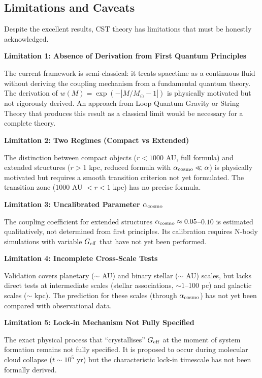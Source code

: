\documentclass[11pt,a4paper]{article}
\begin{document}
\hypertarget{limitations-and-caveats}{%
\subsection{Limitations and
Caveats}\label{limitations-and-caveats}}

Despite the excellent results, CST theory has limitations that must be
honestly acknowledged.

\textbf{Limitation 1: Absence of Derivation from First Quantum
Principles}

The current framework is semi-classical: it treats spacetime as a
continuous fluid without deriving the coupling mechanism from a
fundamental quantum theory. The derivation of
\(w(M) = \exp(-|M/M_\odot - 1|)\) is physically motivated but not
rigorously derived. An approach from Loop Quantum Gravity or String
Theory that produces this result as a classical limit would be necessary
for a complete theory.

\textbf{Limitation 2: Two Regimes (Compact vs Extended)}

The distinction between compact objects (\(r < 1000\) AU, full formula)
and extended structures (\(r > 1\) kpc, reduced formula with
\(\alpha_{\rm cosmo} \ll \alpha\)) is physically motivated but requires
a smooth transition criterion not yet formulated. The transition zone
(\(1000\) AU \(< r < 1\) kpc) has no precise formula.

\textbf{Limitation 3: Uncalibrated Parameter \(\alpha_{\rm cosmo}\)}

The coupling coefficient for extended structures
\(\alpha_{\rm cosmo} \approx 0.05\)--\(0.10\) is estimated
qualitatively, not determined from first principles. Its calibration
requires N-body simulations with variable \(G_{\rm eff}\) that have not
yet been performed.

\textbf{Limitation 4: Incomplete Cross-Scale Tests}

Validation covers planetary (\(\sim\) AU) and binary stellar (\(\sim\)
AU) scales, but lacks direct tests at intermediate scales (stellar
associations, \(\sim 1\)--100 pc) and galactic scales (\(\sim\) kpc).
The prediction for these scales (through \(\alpha_{\rm cosmo}\)) has not
yet been compared with observational data.

\textbf{Limitation 5: Lock-in Mechanism Not Fully Specified}

The exact physical process that ``crystallises'' \(G_{\rm eff}\) at the
moment of system formation remains not fully specified. It is proposed
to occur during molecular cloud collapse (\(t \sim 10^5\) yr) but the
characteristic lock-in timescale has not been formally derived.
\end{document}
